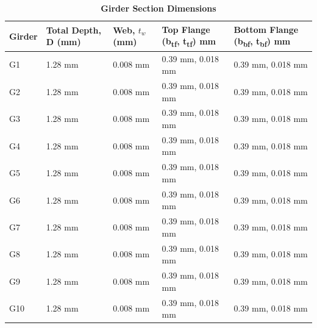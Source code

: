 \documentclass[12pt,a4paper]{report}
\numberwithin{table}{chapter}
\numberwithin{figure}{chapter}
\begin{document}
\vspace{4pt}
\begin{longtable}{|L{1.8cm}|L{2.3cm}|L{1.8cm}|p{4.8cm}|p{4.8cm}|}
\caption{\textbf{Girder Section Dimensions}}
\hline
\textbf{Girder} & \textbf{Total Depth, D (mm)} & \textbf{Web, $t_w$ (mm)} & \textbf{Top Flange (b\textsubscript{tf}, t\textsubscript{tf}) mm} & \textbf{Bottom Flange (b\textsubscript{bf}, t\textsubscript{bf}) mm} \\[6pt]
\hline
G1 & 1.28 mm & 0.008 mm & 0.39 mm, 0.018 mm & 0.39 mm, 0.018 mm \\[8pt]
\hline
G2 & 1.28 mm & 0.008 mm & 0.39 mm, 0.018 mm & 0.39 mm, 0.018 mm \\[8pt]
\hline
G3 & 1.28 mm & 0.008 mm & 0.39 mm, 0.018 mm & 0.39 mm, 0.018 mm \\[8pt]
\hline
G4 & 1.28 mm & 0.008 mm & 0.39 mm, 0.018 mm & 0.39 mm, 0.018 mm \\[8pt]
\hline
G5 & 1.28 mm & 0.008 mm & 0.39 mm, 0.018 mm & 0.39 mm, 0.018 mm \\[8pt]
\hline
G6 & 1.28 mm & 0.008 mm & 0.39 mm, 0.018 mm & 0.39 mm, 0.018 mm \\[8pt]
\hline
G7 & 1.28 mm & 0.008 mm & 0.39 mm, 0.018 mm & 0.39 mm, 0.018 mm \\[8pt]
\hline
G8 & 1.28 mm & 0.008 mm & 0.39 mm, 0.018 mm & 0.39 mm, 0.018 mm \\[8pt]
\hline
G9 & 1.28 mm & 0.008 mm & 0.39 mm, 0.018 mm & 0.39 mm, 0.018 mm \\[8pt]
\hline
G10 & 1.28 mm & 0.008 mm & 0.39 mm, 0.018 mm & 0.39 mm, 0.018 mm \\[8pt]
\hline
\end{longtable}

\vspace{0.6em}
\end{document}
